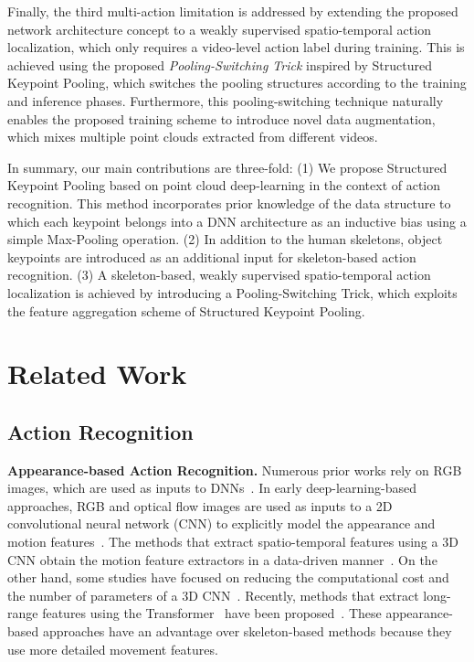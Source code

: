 \documentclass[10pt,twocolumn,letterpaper]{article}
\begin{document}
Finally, the third multi-action limitation is addressed by extending the proposed network architecture concept to a weakly supervised spatio-temporal action localization, which only requires a video-level action label during training.
This is achieved using the proposed \textit{Pooling-Switching Trick} inspired by Structured Keypoint Pooling, which switches the pooling structures according to the training and inference phases.
Furthermore, this pooling-switching technique naturally enables the proposed training scheme to introduce novel data augmentation, which mixes multiple point clouds extracted from different videos.

In summary, our main contributions are three-fold:
(1) We propose Structured Keypoint Pooling based on point cloud deep-learning in the context of action recognition.
This method incorporates prior knowledge of the data structure to which each keypoint belongs into a DNN architecture as an inductive bias using a simple Max-Pooling operation.
(2) In addition to the human skeletons, object keypoints are introduced as an additional input for skeleton-based action recognition.
(3) A skeleton-based, weakly supervised spatio-temporal action localization is achieved by introducing a Pooling-Switching Trick, which exploits the feature aggregation scheme of Structured Keypoint Pooling.

\section{Related Work}
\subsection{Action Recognition}
\noindent \textbf{Appearance-based Action Recognition.}
Numerous prior works rely on RGB images, which are used as inputs to DNNs~\cite{Simonyan2014Neurips,Ng2015CVPR,Tran2015ICCV,Feichtenhofer2016Neurips,Carreira2017CVPR,Tran2018CVPR,Xie2018ECCV,Feichtenhofer2019ICCV,Feichtenhofer2020CVPR,Girdhar2019CVPR}.
In early deep-learning-based approaches, RGB and optical flow images are used as inputs to a 2D convolutional neural network (CNN) to explicitly model the appearance and motion features~\cite{Simonyan2014Neurips,Ng2015CVPR}.
The methods that extract spatio-temporal features using a 3D CNN obtain the motion feature extractors in a data-driven manner~\cite{Tran2015ICCV,Feichtenhofer2016Neurips,Carreira2017CVPR}.
On the other hand, some studies have focused on reducing the computational cost and the number of parameters of a 3D CNN~\cite{Tran2018CVPR,Xie2018ECCV,Feichtenhofer2019ICCV,Feichtenhofer2020CVPR}.
Recently, methods that extract long-range features using the Transformer~\cite{Vaswani2017Neurips} have been proposed~\cite{Girdhar2019CVPR,Arnab2021ICCV,Liu2022CVPR}.
These appearance-based approaches have an advantage over skeleton-based methods because they use more detailed movement features.
\end{document}
